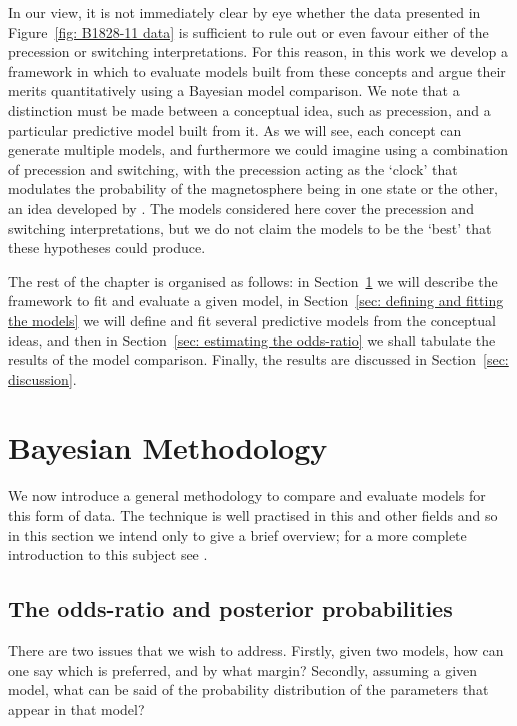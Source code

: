 \documentclass[../full_thesis/full_thesis.tex]{subfiles}
\begin{document}
In our view, it is not immediately clear by eye whether the data presented in
Figure~\ref{fig: B1828-11 data} is sufficient to rule out or even favour either
of the precession or switching interpretations.  For this reason, in this work
we develop a framework in which to evaluate models built from these concepts
and argue their merits quantitatively using a Bayesian model comparison. We
note that a distinction must be made between a conceptual idea, such as
precession, and a particular predictive model built from it. As we will see,
each concept can generate multiple models, and furthermore we could imagine
using a combination of precession and switching,  with the precession acting as
the `clock' that modulates the probability of the magnetosphere being in one
state or the other, an idea developed by  \citet{Jones2012}. The models
considered here cover the precession and switching interpretations, but we do
not claim the models to be the `best' that these hypotheses could produce.

The rest of the chapter is organised as follows: in Section~\ref{sec: methodology} we
will describe the framework to fit and evaluate a given model, in
Section~\ref{sec: defining and fitting the models} we will define and fit several
predictive models from the conceptual ideas, and then in Section~\ref{sec:
estimating the odds-ratio} we shall tabulate the results of the model
comparison. Finally, the results are discussed in Section~\ref{sec: discussion}.





\section{ Bayesian Methodology}
\label{sec: methodology}
We now introduce a general methodology to compare and evaluate models for this
form of data. The technique is well practised in this and other fields and so
in this section we intend only to give a brief overview; for a more complete
introduction to this subject see \cite{jaynes2003probability,
gelman2013bayesian, sivia1996data}.

\subsection{The odds-ratio and posterior probabilities}

There are two issues that we wish to address.  Firstly, given two models, how
can one say which is preferred, and by what margin?  Secondly, assuming a given
model, what can be said of the probability distribution of the
parameters that appear in that model?
\end{document}
